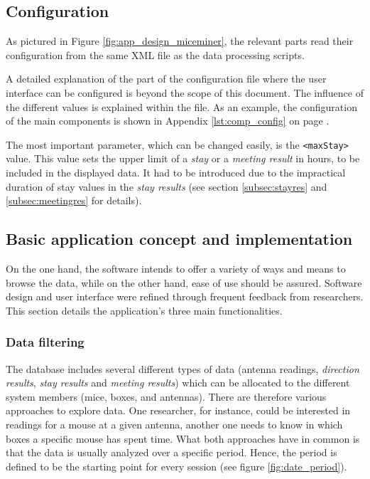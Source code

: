 \subsection{Configuration}
\label{subsec:miceminer_config}

As pictured in Figure \ref{fig:app_design_miceminer}, the relevant parts read their configuration from the same XML file as the data processing scripts. 

A detailed explanation of the part of the configuration file where the user interface can be configured is beyond the scope of this document. The influence of the different values is explained within the file. As an example, the configuration of the main components is shown in Appendix \ref{lst:comp_config} on page \pageref{lst:comp_config}.

The most important parameter, which can be changed easily, is the \lstinline|<maxStay>| value. This value sets the upper limit of a \textit{stay} or a \textit{meeting result} in hours, to be included in the displayed data. It had to be introduced due to the impractical duration of stay values in the \textit{stay results} (see section \ref{subsec:stayres} and \ref{subsec:meetingres} for details).

\subsection{Basic application concept and implementation}
\label{subsec:app_concept}

On the one hand, the software intends to offer a variety of ways and means to browse the data, while on the other hand, ease of use should be assured. Software design and user interface were refined through frequent feedback from researchers. This section details the application's three main functionalities.
   
\subsubsection{Data filtering}
\label{sububsec:datafilter}

The database includes several different types of data (antenna readings, \textit{direction results}, \textit{stay results} and \textit{meeting results}) which can be allocated to the different system members (mice, boxes, and antennas). There are therefore various approaches to explore data. One researcher, for instance, could be interested in readings for a mouse at a given antenna, another one needs to know in which boxes a specific mouse has spent time. What both approaches have in common is that the data is usually analyzed over a specific period. Hence, the period is defined to be the starting point for every session (see figure \ref{fig:date_period}).

